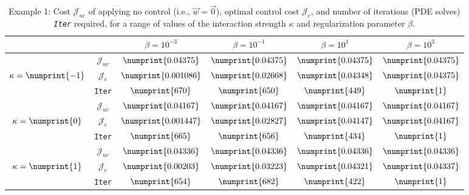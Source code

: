 \documentclass[11pt, a4paper]{article}
\theoremstyle{definition}
\begin{document}
\begin{table}
	\begin{tabular}{ | c | c || c | c | c | c ||}
		\hline
		\multicolumn{2}{|c||}{}& $\beta = 10^{-3}$ & $\beta = 10^{-1}$ & $\beta = 10^{1}$ & $\beta = 10^{3}$  \\
		\hline
		\hline
		& $\mathcal{J}_{uc}$ & $\numprint{0.04375}$ & $\numprint{0.04375}$ & $\numprint{0.04375}$ & $\numprint{0.04375}$ \\
		$\kappa= \numprint{-1}$  & $\mathcal{J}_c$ & $\numprint{0.001086}$ & $\numprint{0.02668}$ & $\numprint{0.04348}$ & $\numprint{0.04375}$ \\
		& \texttt{Iter} & $\numprint{670}$ & $\numprint{650}$ & $\numprint{449}$ & $\numprint{1}$ \\
		\hline
		& $\mathcal{J}_{uc}$ & $\numprint{0.04167}$ & $\numprint{0.04167}$ & $\numprint{0.04167}$ & $\numprint{0.04167}$ \\
		$\kappa= \numprint{0}$  & $\mathcal{J}_c$ & $\numprint{0.001447}$ & $\numprint{0.02827}$ & $\numprint{0.04147}$ & $\numprint{0.04167}$ \\
		& \texttt{Iter} & $\numprint{665}$ & $\numprint{656}$ & $\numprint{434}$ & $\numprint{1}$ \\
		\hline
		& $\mathcal{J}_{uc}$ & $\numprint{0.04336}$ & $\numprint{0.04336}$ & $\numprint{0.04336}$ & $\numprint{0.04336}$ \\
		$\kappa= \numprint{1}$  & $\mathcal{J}_c$ & $\numprint{0.00203}$ & $\numprint{0.03223}$ & $\numprint{0.04321}$ & $\numprint{0.04337}$ \\
		& \texttt{Iter} & $\numprint{654}$ & $\numprint{682}$ & $\numprint{422}$ & $\numprint{1}$ \\
		\hline
	\end{tabular}
	\caption{Example 1: Cost $\mathcal{J}_{uc}$ of applying no control (i.e., $\vec{w} = \vec{0}$), optimal control cost $\mathcal{J}_{c}$, and number of iterations (PDE solves) \emph{\texttt{Iter}} required, for a range of values of the interaction strength $\kappa$ and regularization parameter $\beta$.}
	\label{TabS5:Prob1}
\end{table}
\end{document}
